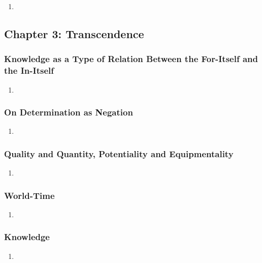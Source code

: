 \begin{enumerate}
  \item
\end{enumerate}

\subsection{Chapter 3: Transcendence}

\subsubsection{Knowledge as a Type of Relation Between the For-Itself and the In-Itself}

\begin{enumerate}
  \item
\end{enumerate}

\subsubsection{On Determination as Negation}

\begin{enumerate}
  \item
\end{enumerate}

\subsubsection{Quality and Quantity, Potentiality and Equipmentality}

\begin{enumerate}
  \item
\end{enumerate}

\subsubsection{World-Time}

\begin{enumerate}
  \item
\end{enumerate}

\subsubsection{Knowledge}

\begin{enumerate}
  \item
\end{enumerate}
